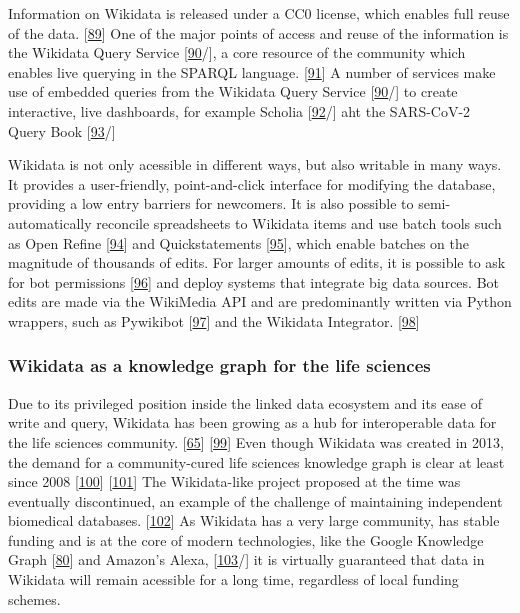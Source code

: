 Information on Wikidata is released under a CC0 license, which enables full reuse of the data. {[}\protect\hyperlink{ref-tQIJPG4k}{89}{]}
One of the major points of access and reuse of the information is the Wikidata Query Service {[}\protect\hyperlink{ref-2wDsXBwd}{90}/{]}, a core resource of the community which enables live querying in the SPARQL language. {[}\protect\hyperlink{ref-t66jYhqe}{91}{]}
A number of services make use of embedded queries from the Wikidata Query Service {[}\protect\hyperlink{ref-2wDsXBwd}{90}/{]} to create interactive, live dashboards, for example Scholia {[}\protect\hyperlink{ref-17P4zruFZ}{92}/{]} aht the SARS-CoV-2 Query Book {[}\protect\hyperlink{ref-guMp3q1V}{93}/{]}

Wikidata is not only acessible in different ways, but also writable in many ways.
It provides a user-friendly, point-and-click interface for modifying the database, providing a low entry barriers for newcomers.
It is also possible to semi-automatically reconcile spreadsheets to Wikidata items and use batch tools such as Open Refine {[}\protect\hyperlink{ref-17rRjL1Xj}{94}{]} and Quickstatements {[}\protect\hyperlink{ref-K6ggpwRg}{95}{]}, which enable batches on the magnitude of thousands of edits.
For larger amounts of edits, it is possible to ask for bot permissions {[}\protect\hyperlink{ref-sSH04fxa}{96}{]} and deploy systems that integrate big data sources.
Bot edits are made via the WikiMedia API and are predominantly written via Python wrappers, such as Pywikibot {[}\protect\hyperlink{ref-5K5MfnVl}{97}{]} and the Wikidata Integrator. {[}\protect\hyperlink{ref-qDI8I4IJ}{98}{]}

\hypertarget{wikidata-as-a-knowledge-graph-for-the-life-sciences}{%
\subsubsection{Wikidata as a knowledge graph for the life sciences}\label{wikidata-as-a-knowledge-graph-for-the-life-sciences}}

Due to its privileged position inside the linked data ecosystem and its ease of write and query, Wikidata has been growing as a hub for interoperable data for the life sciences community. {[}\protect\hyperlink{ref-3GqlN9Dk}{65}{]} {[}\protect\hyperlink{ref-Ym2HoRLl}{99}{]}
Even though Wikidata was created in 2013, the demand for a community-cured life sciences knowledge graph is clear at least since 2008 {[}\protect\hyperlink{ref-179mXrGIk}{100}{]} {[}\protect\hyperlink{ref-TItj7EYf}{101}{]}
The Wikidata-like project proposed at the time was eventually discontinued, an example of the challenge of maintaining independent biomedical databases. {[}\protect\hyperlink{ref-P2QdZvGc}{102}{]}
As Wikidata has a very large community, has stable funding and is at the core of modern technologies, like the Google Knowledge Graph {[}\protect\hyperlink{ref-xLpRePoh}{80}{]} and Amazon's Alexa, {[}\protect\hyperlink{ref-bO7BekzO}{103}/{]} it is virtually guaranteed that data in Wikidata will remain acessible for a long time, regardless of local funding schemes.

